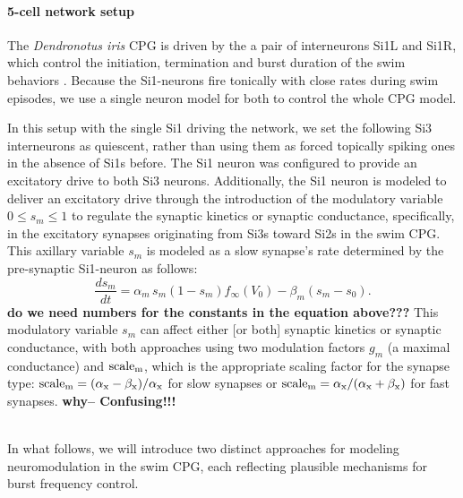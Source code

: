\documentclass[nofootinbib,aip,amsmath,amssymb,reprint,twocolumn,10pt]{revtex4-2}
\begin{document}
\paragraph{5-cell network setup}

The {\em \textit{Dendronotus iris}} CPG is driven by the a pair of interneurons Si1L and Si1R, which control the initiation, termination and burst duration of the swim behaviors \cite{sakurai2019command, SakuraiKatz2016}. Because the Si1-neurons fire tonically with close rates during swim episodes, we use a single neuron model for both to control the whole CPG model.

In this setup with the single Si1 driving the network, we set the following Si3 interneurons as quiescent, rather than using them as forced topically spiking ones in the absence of Si1s before. The Si1 neuron was configured to provide an excitatory drive to both Si3 neurons. Additionally, the Si1 neuron is modeled to deliver an excitatory drive through  the introduction of the modulatory variable $0 \le s_m \le 1$ to regulate the synaptic kinetics or synaptic conductance, specifically, in the excitatory synapses originating from Si3s toward Si2s in the swim CPG. This axillary variable $s_m$ is modeled as a slow synapse's rate determined by the pre-synaptic Si1-neuron as follows:
%
\begin{equation}
\frac{ds_m}{dt} = \alpha_m\, s_m (1 - s_m) f_{\infty}(V_0) - \beta_m (s_m - s_0).
\end{equation}
{\bf do we need numbers for the constants in the equation above???}
%
This modulatory variable  $s_m$ can affect either [or both] synaptic kinetics or synaptic conductance, with both approaches using two modulation factors $g_m$ (a maximal conductance) and $\rm scale_m$, which is the appropriate scaling factor for the synapse type: $\rm scale_m = (\alpha_x - \beta_x)/\alpha_x$ for slow synapses or $\rm scale_m = \alpha_x/(\alpha_x + \beta_x)$ for fast synapses. {\bf why--  Confusing!!! }

~\\
In what follows, we will introduce two distinct approaches for modeling neuromodulation in the swim CPG, each reflecting plausible mechanisms for burst frequency control.
\end{document}
